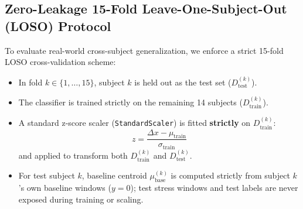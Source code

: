\documentclass[conference]{IEEEtran}
\begin{document}
\subsection{Zero-Leakage 15-Fold Leave-One-Subject-Out (LOSO) Protocol}
To evaluate real-world cross-subject generalization, we enforce a strict 15-fold LOSO cross-validation scheme:
\begin{itemize}
    \item In fold $k \in \{1, \dots, 15\}$, subject $k$ is held out as the test set ($D_{\text{test}}^{(k)}$).
    \item The classifier is trained strictly on the remaining 14 subjects ($D_{\text{train}}^{(k)}$).
    \item A standard z-score scaler (\texttt{StandardScaler}) is fitted \textbf{strictly} on $D_{\text{train}}^{(k)}$:
    \begin{equation}
        z = \frac{\Delta x - \mu_{\text{train}}}{\sigma_{\text{train}}}
        \label{eq:zscore}
    \end{equation}
    and applied to transform both $D_{\text{train}}^{(k)}$ and $D_{\text{test}}^{(k)}$.
    \item For test subject $k$, baseline centroid $\mu_{\text{base}}^{(k)}$ is computed strictly from subject $k$'s own baseline windows ($y=0$); test stress windows and test labels are never exposed during training or scaling.
\end{itemize}
\end{document}
